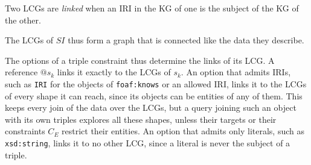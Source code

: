 \begin{definition}[Link]\label{def:link}
Two \acp{LCG} are \emph{linked} when an \ac{IRI} in the \ac{KG} of one is the subject of the \ac{KG} of the other.
\end{definition}

The \acp{LCG} of $SI$ thus form a graph that is connected like the data they describe.

The options of a triple constraint thus determine the links of its \ac{LCG}.
A reference $@s_k$ links it exactly to the \acp{LCG} of $s_k$.
An option that admits \acp{IRI}, such as \texttt{IRI} for the objects of \texttt{foaf:knows} or an allowed \ac{IRI}, links it to the \acp{LCG} of every shape it can reach, since its objects can be entities of any of them.
This keeps every join of the data over the \acp{LCG}, but a query joining such an object with its own triples explores all these shapes, unless their targets or their constraints $C_E$ restrict their entities.
An option that admits only literals, such as \texttt{xsd:string}, links it to no other \ac{LCG}, since a literal is never the subject of a triple.

